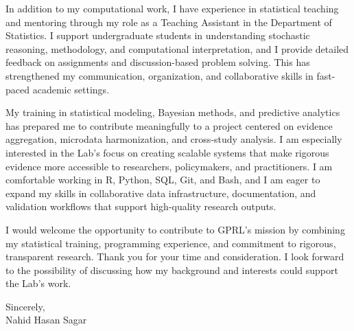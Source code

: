 \documentclass[11pt,letterpaper]{article}
\begin{document}
In addition to my computational work, I have experience in statistical teaching and mentoring through my role as a Teaching Assistant in the Department of Statistics. I support undergraduate students in understanding stochastic reasoning, methodology, and computational interpretation, and I provide detailed feedback on assignments and discussion-based problem solving. This has strengthened my communication, organization, and collaborative skills in fast-paced academic settings.

My training in statistical modeling, Bayesian methods, and predictive analytics has prepared me to contribute meaningfully to a project centered on evidence aggregation, microdata harmonization, and cross-study analysis. I am especially interested in the Lab's focus on creating scalable systems that make rigorous evidence more accessible to researchers, policymakers, and practitioners. I am comfortable working in R, Python, SQL, Git, and Bash, and I am eager to expand my skills in collaborative data infrastructure, documentation, and validation workflows that support high-quality research outputs.

I would welcome the opportunity to contribute to GPRL's mission by combining my statistical training, programming experience, and commitment to rigorous, transparent research. Thank you for your time and consideration. I look forward to the possibility of discussing how my background and interests could support the Lab's work.

Sincerely,\\[1em]
Nahid Hasan Sagar
\end{document}
